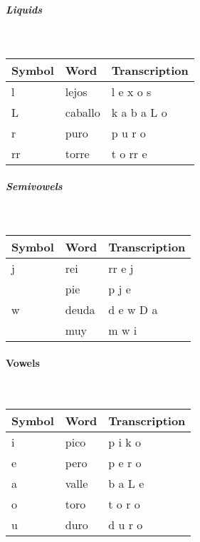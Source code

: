 \subparagraph{Liquids}\strut\\
\begin{tabular}{lll}
	Symbol & Word & Transcription\\
	\hline
	l & lejos & l e x o s\\
	L & caballo & k a b a L o\\
	r & puro & p u r o\\
	rr & torre & t o rr e
\end{tabular}

\subparagraph{Semivowels}\strut\\
\begin{tabular}{lll}
	Symbol & Word & Transcription\\
	\hline
	j & rei & rr e j\\
	 & pie & p j e\\
	w & deuda & d e w D a\\
	 & muy & m w i
\end{tabular}

\paragraph{Vowels}\strut\\
\begin{tabular}{lll}
	Symbol & Word & Transcription\\
	\hline
	i & pico & p i k o\\
	e & pero & p e r o\\
	a & valle & b a L e\\
	o & toro & t o r o\\
	u & duro & d u r o
\end{tabular}

\newpage
